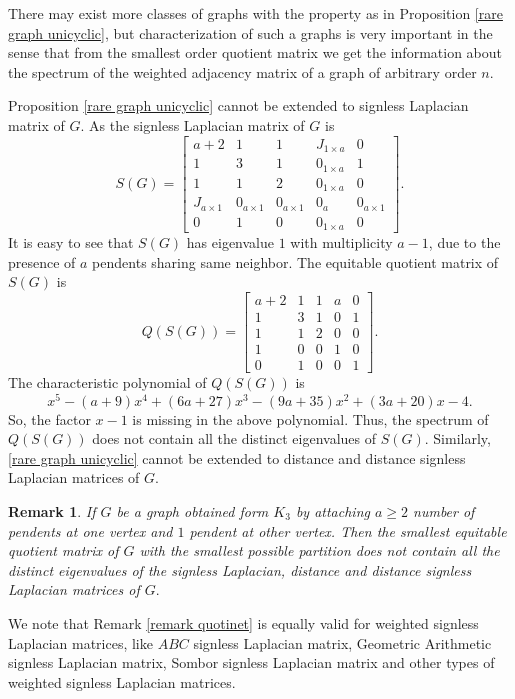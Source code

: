 \documentclass[12pt,twoside]{article}
\newtheorem{remark}[theorem]{Remark}
\begin{document}
 There may exist more classes of graphs with the property as in Proposition \ref{rare graph unicyclic}, but characterization of such a graphs is very important in the sense that from the smallest order quotient matrix  we get the information about the spectrum of the weighted adjacency matrix of a graph of arbitrary order $n.$
 
 Proposition \ref{rare graph unicyclic} cannot be extended to signless Laplacian matrix of $G$. As the signless Laplacian matrix of $G$ is 
 $$ S(G)=\begin{bmatrix}
 	a+2 & 1 & 1 & J_{1\times a} & 0\\
 	1 & 3 & 1 & 0_{1\times a} & 1\\
 	1 & 1 & 2 & 0_{1\times a} & 0\\
 	J_{a\times 1} & 0_{a\times 1} & 0_{a\times 1} & 0_{a} & 0_{a\times 1}\\
 	0 & 1 & 0 & 0_{1\times a} & 0
 \end{bmatrix}. $$
 It is easy to see that $S(G)$ has eigenvalue $1$ with multiplicity $a-1$, due to the presence of $a$ pendents sharing same neighbor. The equitable quotient matrix of $S(G)$ is
$$ Q(S(G))=\left[
 \begin{array}{ccccc}
 	a+2 & 1 & 1 & a & 0 \\
 	1 & 3 & 1 & 0 & 1 \\
 	1 & 1 & 2 & 0 & 0 \\
 	1 & 0 & 0 & 1 & 0 \\
 	0 & 1 & 0 & 0 & 1 
 \end{array} \right]. 
$$
The characteristic polynomial of $Q(S(G))$ is  
$$x^{5}-(a+9) x^4+(6 a+27) x^3-(9 a+35) x^2+(3 a+20) x-4. $$
So, the factor $x-1$ is missing in the above polynomial. Thus, the spectrum of $Q(S(G))$ does not contain all the distinct eigenvalues of $S(G).$ Similarly,  \ref{rare graph unicyclic} cannot be extended to distance and distance signless Laplacian matrices of $G.$ 
\begin{remark}\label{remark quotinet}
	If $G$ be a graph obtained form $K_{3}$ by attaching $a\geq 2$ number of pendents at one vertex and $1$ pendent at other vertex. Then the smallest equitable quotient matrix of $G$ with the smallest possible partition does not contain all the distinct eigenvalues of the signless Laplacian, distance and distance signless Laplacian matrices of $G.$
\end{remark}
We note that Remark \eqref{remark quotinet} is equally valid for weighted signless Laplacian matrices, like $ABC$ signless Laplacian matrix, Geometric Arithmetic signless Laplacian matrix, Sombor signless Laplacian matrix and other types of  weighted signless Laplacian matrices.
\end{document}
